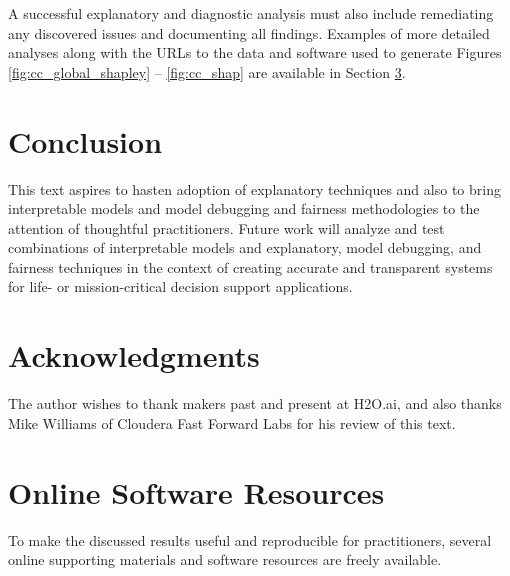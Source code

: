 \documentclass[sigconf, review]{acmart}
\begin{document}
\noindent A successful explanatory and diagnostic analysis must also include remediating any discovered issues and documenting all findings. Examples of more detailed analyses along with the URLs to the data and software used to generate Figures \ref{fig:cc_global_shapley} -- \ref{fig:cc_shap} are available in Section \ref{sec:software}.


\section{Conclusion}

This text aspires to hasten adoption of explanatory techniques and also to bring interpretable models and model debugging and fairness methodologies to the attention of thoughtful practitioners. Future work will analyze and test combinations of interpretable models and explanatory, model debugging, and fairness techniques in the context of creating accurate and transparent systems for life- or mission-critical decision support applications. 

\section{Acknowledgments}

The author wishes to thank makers past and present at H2O.ai, and also thanks Mike Williams of Cloudera Fast Forward Labs for his review of this text.  




% 
\appendix
\onecolumn
\section{Online Software Resources} \label{sec:software}

To make the discussed results useful and reproducible for practitioners, several online supporting materials and software resources are freely available.\\
\end{document}

